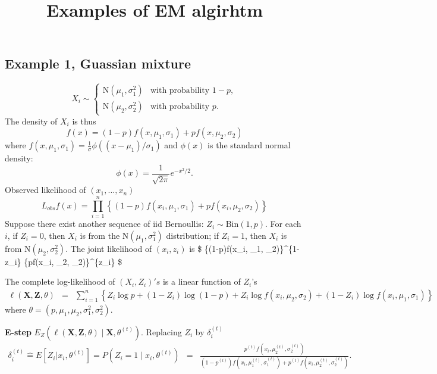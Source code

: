 \documentclass[]{article}
\title{Examples of EM algirhtm}
\author{}
\date{}
\begin{document}
\maketitle

\hypertarget{example-1-guassian-mixture}{%
\subsection{Example 1, Guassian
mixture}\label{example-1-guassian-mixture}}

\[X_i \sim \left\{ \begin{array}{ll}
\textrm{N}(\mu_1, \sigma_1^2) & \textrm{with probability} \,\, 1-p, \\
\textrm{N}(\mu_2, \sigma_2^2) & \textrm{with probability} \,\, p.
\end{array} \right.\] The density of \(X_i\) is thus
\[f(x) = (1-p)f(x, \mu_1, \sigma_1) + p f(x, \mu_2, \sigma_2)\] where
\(f(x, \mu_1, \sigma_1) = \frac{1}{\sigma}\phi((x-\mu_1)/\sigma_1)\) and
\(\phi(x)\) is the standard normal density:
\[\phi(x) = \frac{1}{\sqrt{2\pi}} e^{-x^2/2}.\] Observed likelihood of
\((x_1,...,x_n)\)
\[L_{obs}f(x) = \prod_{i=1}^n\left\{(1-p)f(x_i, \mu_1, \sigma_1) + p f(x_i, \mu_2, \sigma_2)\right\} \]
Suppose there exist another sequence of iid Bernoullis:
\(Z_i \sim \textrm{Bin}(1,p)\). For each \(i\), if \(Z_i=0\), then
\(X_i\) is from the N\((\mu_1, \sigma_1^2)\) distribution; if \(Z_i=1\),
then \(X_i\) is from N\((\mu_2, \sigma_2^2)\). The joint likelihood of
\((x_i, z_i)\) is \$ \{(1-p)f(x\_i, \mu\_1, \sigma\_2)\}\^{}\{1-z\_i\}
\{pf(x\_i, \mu\_2, \sigma\_2)\}\^{}\{z\_i\} \$

The complete log-likelihood of \((X_i, Z_i)'s\) is a linear function of
\(Z_i\)'s \begin{eqnarray*}
\ell( \mathbf{X}, \mathbf{Z}, \theta ) & =&  \sum_{i=1}^n \left\{Z_i \log p + (1-Z_i)\log(1-p)  
+ 
Z_i \log f(x_i, \mu_2, \sigma_2) + (1-Z_i) \log f(x_i, \mu_1, \sigma_1)  \right\}
\end{eqnarray*} where
\(\theta = (p, \mu_1, \mu_2,\sigma_1^2,\sigma_2^2)\).

\textbf{E-step}
\(E_Z(\ell( \mathbf{X}, \mathbf{Z}, \theta ) \mid \mathbf{X}, \theta^{(t)})\).
Replacing \(Z_i\) by \(\delta_i^{(t)}\) \begin{eqnarray*}\label{expZ}
{\delta_i^{(t)}\widehat{=}E[Z_i|x_i, \theta^{(t)}] = P(Z_i=1\mid x_i,  \theta^{(t)})}
& =&
\frac{p^{(t)}f(x_i, \mu_2^{(t)}, \sigma_2^{(t)})}
{(1-p^{(t)})f(x_i, \mu_1^{(t)}, \sigma_1^{(t)}) + p^{(t)}f(x_i, \mu_2^{(t)}, \sigma_2^{(t)})}.
\end{eqnarray*}
\end{document}
